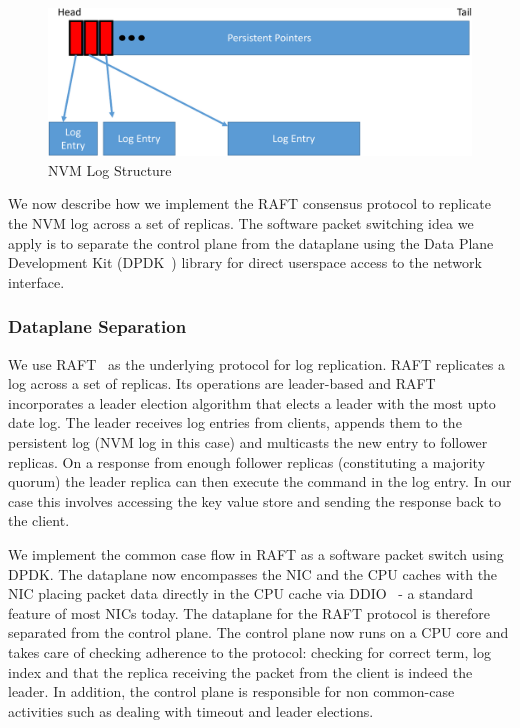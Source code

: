 \documentclass[10pt, preprint, nonatbib]{sigplanconf}
\begin{document}
\begin{figure}
\centering
\includegraphics[scale=0.3]{figures2/nvm_log.pdf}
\caption{NVM Log Structure}
\label{fig:nvm_log}
\end{figure}

We now describe how we implement the RAFT consensus protocol to replicate the
NVM log across a set of replicas. The software packet switching idea we apply is
to separate the control plane from the dataplane using the Data Plane
Development Kit (DPDK~\cite{dpdk}) library for direct userspace access to the
network interface.

\subsubsection{Dataplane Separation}
We use RAFT~\cite{raft} as the underlying protocol for log replication. RAFT
replicates a log across a set of replicas. Its operations are leader-based and
RAFT incorporates a leader election algorithm that elects a leader with the most
upto date log. The leader receives log entries from clients, appends them to the
persistent log (NVM log in this case) and multicasts the new entry to follower
replicas. On a response from enough follower replicas (constituting a majority
quorum) the leader replica can then execute the command in the log entry. In
our case this involves accessing the key value store and sending the response
back to the client.

We implement the common case flow in RAFT as a software packet switch using
DPDK. The dataplane now encompasses the NIC and the CPU caches with the NIC
placing packet data directly in the CPU cache via DDIO~\cite{ddio} - a standard
feature of most NICs today. The dataplane for the RAFT protocol is therefore
separated from the control plane. The control plane now runs on a CPU core and
takes care of checking adherence to the protocol: checking for correct term, log
index and that the replica receiving the packet from the client is indeed the
leader. In addition, the control plane is responsible for non common-case
activities such as dealing with timeout and leader elections.
\end{document}
